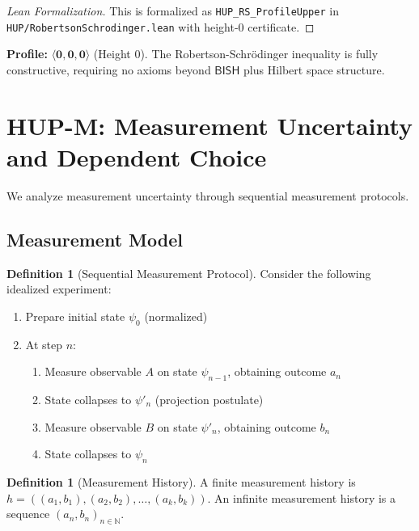 \documentclass[11pt]{article}
\newcommand{\BISH}{\mathsf{BISH}}
\newcommand{\hzero}{\mathbf{0}}
\newcommand{\allzero}{\langle \hzero,\hzero,\hzero\rangle}
\newcommand{\lean}[1]{\texttt{#1}}
\theoremstyle{plain}
\theoremstyle{definition}
\newtheorem{definition}[theorem]{Definition}
\theoremstyle{remark}
\begin{document}
\begin{proof}[Lean Formalization]
This is formalized as \lean{HUP\_RS\_ProfileUpper} in \texttt{HUP/RobertsonSchrodinger.lean} with height-0 certificate.
\end{proof}

\noindent\textbf{Profile:} $\allzero$ (Height 0). The Robertson-Schrödinger inequality is fully constructive, requiring no axioms beyond $\BISH$ plus Hilbert space structure.

\section{HUP-M: Measurement Uncertainty and Dependent Choice}

We analyze measurement uncertainty through sequential measurement protocols.

\subsection{Measurement Model}

\begin{definition}[Sequential Measurement Protocol]
Consider the following idealized experiment:
\begin{enumerate}
\item Prepare initial state $\psi_0$ (normalized)
\item At step $n$: 
   \begin{enumerate}
   \item Measure observable $A$ on state $\psi_{n-1}$, obtaining outcome $a_n$
   \item State collapses to $\psi'_n$ (projection postulate)
   \item Measure observable $B$ on state $\psi'_n$, obtaining outcome $b_n$ 
   \item State collapses to $\psi_n$
   \end{enumerate}
\end{enumerate}
\end{definition}

\begin{definition}[Measurement History]
A finite measurement history is $h = ((a_1,b_1), (a_2,b_2), \ldots, (a_k,b_k))$.
An infinite measurement history is a sequence $(a_n, b_n)_{n \in \mathbb{N}}$.
\end{definition}
\end{document}
